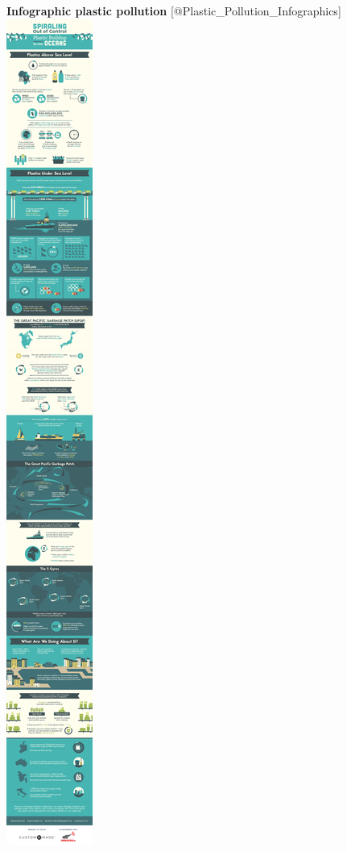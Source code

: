 \documentclass[]{book}
\theoremstyle{definition}
\theoremstyle{definition}
\theoremstyle{definition}
\theoremstyle{remark}
\begin{document}
\textbf{Infographic plastic pollution}
{[}@Plastic\_Pollution\_Infographics{]}
\includegraphics{images/infographic-plastic-buildup.jpg}
\end{document}
